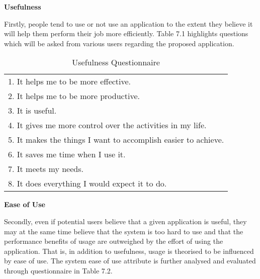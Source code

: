 \textbf{Usefulness}

Firstly, people tend to use or not use an application to the extent they believe it will help them perform their job more efficiently. Table 7.1 highlights questions which will be asked from various users regarding the proposed application.


\begin{table}
\begin{center}
\begin{tabular}{ |l| } 
 \hline
1.	It helps me to be more effective. \\ 
2.	It helps me to be more productive. \\
3.	It is useful.  \\
4.	It gives me more control over the activities in my life.  \\
5.	It makes the things I want to accomplish easier to achieve. \\
6.	It saves me time when I use it.\\
7.	It meets my needs. \\
8.	It does everything I would expect it to do. \\  

 \hline
 \end{tabular}
 \caption{Usefulness Questionnaire}
\label{table:1}
\end{center}
\end{table}

\textbf{Ease of Use}

Secondly, even if potential users believe that a given application is useful, they may at the same time believe that the system is too hard to use and that the performance benefits of usage are outweighed by the effort of using the application. That is, in addition to usefulness, usage is theorised to be influenced by ease of use. The system ease of use attribute is further analysed and evaluated through questionnaire in Table 7.2.


